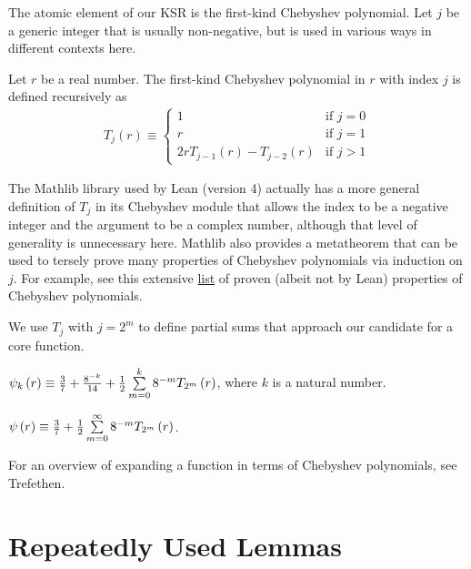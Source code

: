 The atomic element of our KSR is the first-kind Chebyshev polynomial. Let $j$ be a generic integer that is usually non-negative, but is used in various ways in different contexts here.
\begin{definition}
  \label{def:T}
  \leanok
  Let $r$ be a real number. The first-kind Chebyshev polynomial in $r$ with index $j$ is defined recursively as
  \begin{align*}
T_j\left(r\right) \equiv 
\begin{cases}
1 & \text{if } j = 0 \\
r & \text{if } j = 1 \\
2 r T_{j - 1}\left(r\right) - T_{j - 2}\left(r\right) & \text{if } j > 1
\end{cases}
  \end{align*}
\end{definition}
\noindent The Mathlib library used by Lean (version 4) actually has a more general definition of $T_j$ in its Chebyshev module that allows the index to be a negative integer and the argument to be a complex number, although that level of generality is unnecessary here. Mathlib also provides a metatheorem that can be used to tersely prove many properties of Chebyshev polynomials via induction on $j$. For example, see this extensive \href{https://fungrim.org/topic/Chebyshev_polynomials/}{list} of proven (albeit not by Lean) properties of Chebyshev polynomials.

We use $T_j$ with $j = 2^m$ to define partial sums that approach our candidate for a core function.
\begin{definition}[Approximator]
  \label{def:approx}
  \leanok
  $\psi_k\left(r\right) \equiv \frac{3}{7} + \frac{8^{-k}}{14} + \frac{1}{2} \sum\limits_{m = 0}^{k} 8^{-m} T_{2^{m}}\left(r\right)$, where $k$ is a natural number.
\end{definition}
\begin{definition}
  \label{def:core}
  \leanok
  $\psi\left(r\right) \equiv \frac{3}{7} + \frac{1}{2} \sum\limits_{m = 0}^{\infty} 8^{-m} T_{2^{m}}\left(r\right)$.
\end{definition}
\noindent For an overview of expanding a function in terms of Chebyshev polynomials, see Trefethen.

\section{Repeatedly Used Lemmas}\label{sec:RepeatedlyUsedLemmas}

